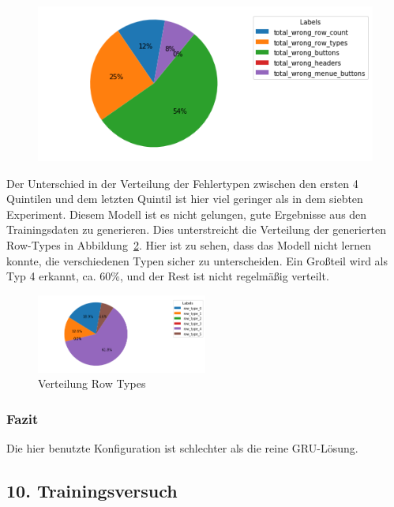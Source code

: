 \documentclass[pdftex,a4paper,halfparskip, article]{scrartcl}
\begin{document}
\begin{figure}
\begin{minipage}{.5\textwidth}
  \centering
   \includegraphics[width=1\linewidth]{predictions_bin12_p80_error_types_pie_chart}
  \label{fig:fehler_schlechteste20_bin12}
\end{minipage}%
\end{figure}

Der Unterschied in der Verteilung der Fehlertypen zwischen den ersten 4 Quintilen und dem letzten Quintil ist hier viel geringer als in dem siebten Experiment. Diesem Modell ist es nicht gelungen, gute Ergebnisse aus den Trainingsdaten zu generieren. Dies unterstreicht die Verteilung der generierten Row-Types in Abbildung~\ref{fig:bin12_row_type}. Hier ist zu sehen, dass das Modell nicht lernen konnte, die verschiedenen Typen sicher zu unterscheiden. Ein Großteil wird als Typ 4 erkannt, ca. 60\%, und der Rest ist nicht regelmäßig verteilt.

\begin{figure}[h]
\centering
\includegraphics[width=0.5\textwidth]{predictions_bin12_predicted_row_type_distribution}
\caption{Verteilung Row Types}
\label{fig:bin12_row_type}
\end{figure}

\subsubsection*{Fazit}

Die hier benutzte Konfiguration ist schlechter als die reine GRU-Lösung.

\subsection{10. Trainingsversuch}
\end{document}
